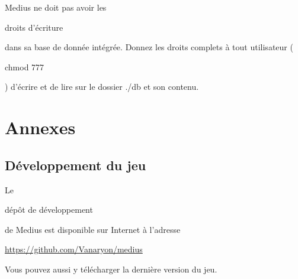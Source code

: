 \documentclass{article}
\begin{document}
Medius ne doit pas avoir les \begin{bfseries}droits d'écriture\end{bfseries} dans sa base de donnée intégrée. Donnez les droits complets à tout utilisateur (\begin{bfseries}chmod 777\end{bfseries}) d'écrire et de lire sur le dossier ./db et son contenu.
\newline\newline

\section{Annexes}

\subsection{Développement du jeu}

Le \begin{bfseries}dépôt de développement\end{bfseries} de Medius est disponible sur Internet à l'adresse \begin{bfseries}\href{https://github.com/Vanaryon/medius}{https://github.com/Vanaryon/medius}\end{bfseries}
\newline\newline
Vous pouvez aussi y télécharger la dernière version du jeu.
\newline\newline
\end{document}
